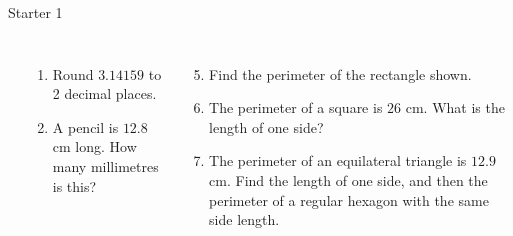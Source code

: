 \documentclass{beamer}
\newcommand{\ablank}[1]{%
  \alt<2>{\textcolor{red}{#1}}{\underline{\phantom{#1}}}%
}
\newcommand{\ashow}[1]{\uncover<2->{\textcolor{red}{\small #1}}}
\newcommand{\ashowq}[1]{\alt<2->{\textcolor{red}{\small #1}}{?}}
\begin{document}
\begin{frame}{Starter 1}
\hypertarget{q-st1}{}

\begin{columns}

\begin{center}
\end{center}

\small
\begin{enumerate}
  \item Round $3.14159$ to 2 decimal places. \ashow{3.14}
  \item A pencil is $12.8$ cm long. How many millimetres is this? \ablank{128 mm}
\end{enumerate}

\begin{enumerate}
  \setcounter{enumi}{4}
  \item Find the perimeter of the rectangle shown. \ashow{25.4 cm}
  \item The perimeter of a square is $26$ cm. What is the length of one side? \ashow{6.5 cm}
  \item  The perimeter of an equilateral triangle is $12.9$ cm. 
    Find the length of one side, and then the perimeter of a regular hexagon with the same side length. \ashow{$4.3$ cm; hexagon: $25.8$ cm}
\end{enumerate}

\end{columns}
\end{frame}
\end{document}
